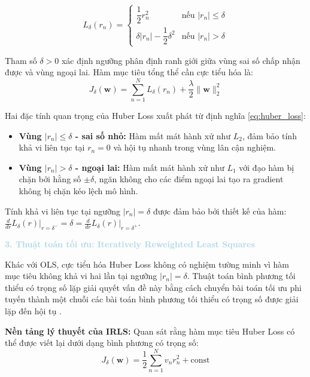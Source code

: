 \begin{equation}
L_\delta(r_n) = \begin{cases} 
  \dfrac{1}{2}r_n^2 & \text{nếu } |r_n| \le \delta \\[6pt]
  \delta|r_n| - \dfrac{1}{2}\delta^2 & \text{nếu } |r_n| > \delta
\end{cases}
\label{eq:huber_loss}
\end{equation}

Tham số $\delta > 0$ xác định ngưỡng phân định ranh giới giữa vùng sai số 
chấp nhận được và vùng ngoại lai. Hàm mục tiêu tổng thể cần cực tiểu hóa là:
$$J_{\delta}(\boldsymbol{w}) = \sum_{n=1}^{N} L_\delta(r_n) 
  + \frac{\lambda}{2}\|\boldsymbol{w}\|^2_2$$

Hai đặc tính quan trọng của Huber Loss xuất phát từ định nghĩa 
\eqref{eq:huber_loss}:
\begin{itemize} [labelsep=10pt, leftmargin=2cm]
    \item \textbf{Vùng $|r_n| \le \delta$ - sai số nhỏ:} Hàm mất mát hành xử 
    như $L_2$, đảm bảo tính khả vi liên tục tại $r_n = 0$ và hội tụ nhanh 
    trong vùng lân cận nghiệm.
    \item \textbf{Vùng $|r_n| > \delta$ - ngoại lai:} Hàm mất mát hành xử 
    như $L_1$ với đạo hàm bị chặn bởi hằng số $\pm\delta$, ngăn không cho 
    các điểm ngoại lai tạo ra gradient không bị chặn 
    kéo lệch mô hình.
\end{itemize}

Tính khả vi liên tục tại ngưỡng $|r_n| = \delta$ được đảm bảo bởi thiết kế 
của hàm: $\frac{d}{dr}L_\delta(r)\big|_{r=\delta^-} = \delta = \frac{d}{dr}L_\delta(r)\big|_{r=\delta^+}$.

\noindent\textcolor{lightblue}{\textbf{3. Thuật toán tối ưu: Iteratively Reweighted Least Squares}}

Khác với OLS, cực tiểu hóa Huber Loss không có nghiệm tường minh 
vì hàm mục tiêu không khả vi hai lần tại ngưỡng 
$|r_n| = \delta$. Thuật toán bình phương tối thiểu có trọng số lặp giải quyết vấn đề này bằng 
cách chuyển bài toán tối ưu phi tuyến thành một chuỗi các bài toán bình phương 
tối thiểu có trọng số được giải lặp đến hội 
tụ \cite{bishop2006pattern}.

\textbf{Nền tảng lý thuyết của IRLS:} Quan sát rằng hàm mục tiêu Huber Loss 
có thể được viết lại dưới dạng bình phương có trọng số:
$$J_\delta(\boldsymbol{w}) 
  = \frac{1}{2}\sum_{n=1}^{N} v_n r_n^2 + \text{const}$$

